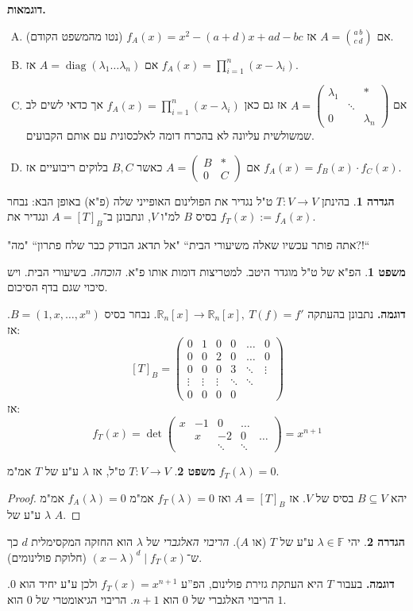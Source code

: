 \documentclass[a4paper]{article}
\newcommand\R     {\mathbb{R}}
\DeclareMathOperator{\diag}    {diag}
\newcommand\F         {\mathbb{F}}
\newcommand\co        {\colon}
\newcommand\pms[1]    {\begin{pmatrix}
		#1
\end{pmatrix}}
\renewcommand\lg      {\lambda}
\theoremstyle{definition}
\newtheorem{Theorem}{\color{myblue}משפט}
\newtheorem{Definition}{\color{mygreen}הגדרה}
\newcommand\theo  [1] {\begin{Theorem}#1\end{Theorem}}
\newcommand\defi  [1] {\begin{Definition}#1\end{Definition}}
\begin{document}
	\textbf{דוגמאות. }\begin{enumerate}[A)]
		\item אם $A = \binom{a \, b}{c \, d}$ אז $f_A(x) = x^{2} - (a + d)x + ad - bc$ (נטו מהמשפט הקודם). 
		\item אם $A = \diag(\lg_1 \dots \lg_n)$ אז $f_A(x) = \prod_{i = 1}^{n}(x - \lg_i)$. 
		\item אם $A = \pms{\lg_1 & & * \\ & \ddots & \\  0 && \lg_n}$ אז גם כאן $f_A(x) = \prod_{i = 1}^{n}(x - \lg_i)$ אך כדאי לשים לב שמשולשית עליונה לא בהכרח דומה לאלכסונית עם אותם הקבועים. 
		\item אם $A = \pms{B & * \\ 0 & C}$ כאשר $B, C$ בלוקים ריבועיים אז $f_A(x) = f_B(x) \cdot f_C(x)$. 
	\end{enumerate}
	
	\defi{בהינתן $T \co V \to V$ ט"ל נגדיר את הפולינום האופייני שלה (פ"א) באופן הבא: נבחר בסיס $B$ למ"ו $V$, ונתבונן ב־$A = [T]_B$ ונגדיר את $f_T(x) := f_A(x)$. }
	
	"אתה פותר עכשיו שאלה משיעורי הבית`` "אל תדאג הבודק כבר שלח פתרון`` "מה?!``
	
	\theo{הפ"א של ט"ל מוגדר היטב. למטריצות דומות אותו פ"א. \textit{הוכחה. }בשיעורי הבית. ויש סיכוי שגם בדף הסיכום. }
	
	\textbf{דוגמה. }נתבונן בהעתקה $\R_n[x] \to \R_n[x], \ T(f) = f'$. נבחר בסיס $B = (1, x, \dots, x^{n})$. אז: 
	\[ [T]_B = \pms{0 & 1  & 0 & 0 & \dots & 0 \\ 0 & 0 & 2 & 0 & \dots & 0 \\ 0 & 0 & 0 & 3 & \ddots & \vdots \\ \vdots & \vdots & \vdots & \ddots & \ddots \\ 0 & 0 & 0 & 0 } \]
	אז: 
	\[ f_T(x) = \det\pms{x & -1 & 0 &\dots \\ & x & -2 & 0 &\dots \\ && \ddots &\ddots } = x^{n + 1} \]
	\theo{$T \co V \to V$ ט"ל, אז $\lg$ ע"ע של $T$ אמ"מ $f_T(\lg) = 0$. }
	\begin{proof}
		יהא $B \subseteq V$ בסיס של $V$. אז $A = [T]_B$ ואז $f_T(\lg) = 0$ אמ"מ $f_A(\lg) = 0$ אמ"מ $\lg$ ע"ע של $A$. 
	\end{proof}
	
	\defi{יהי $\lg \in \F$ ע"ע של $T$ (או $A$). \textit{הריבוי האלגברי} של $\lg$ הוא החזקה המקסימלית $d$ כך ש־$(x - \lg)^{d} \mid f_T(x)$ (חלוקת פולינומים). }
	
	\textbf{דוגמה. }בעבור $T$ היא העתקת גזירת פולינום, הפ''ע $f_T(x) = x^{n + 1}$ ולכן ע"ע יחיד הוא $0$. הריבוי האלגברי של $0$ הוא $n + 1$. הריבוי הגיאומטרי של $0$ הוא $1$. 
	
\end{document}
